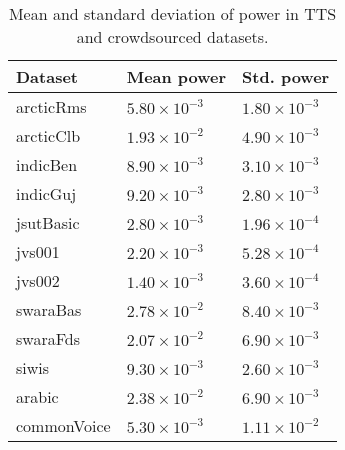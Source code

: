 \documentclass[12pt]{article}
\begin{document}
\begin{table}[]
\begin{center}
\caption{Mean and standard deviation of power in TTS and crowdsourced datasets.}
\label{tab_powerDistribution}
\vspace{3mm}
\begin{tabular}{|l|l|l|}
\hline
Dataset & Mean power & Std. power \\
\hline
arcticRms   & $5.80\times10^{-3}$ & $1.80\times10^{-3}$ \\
arcticClb   & $1.93\times10^{-2}$ & $4.90\times10^{-3}$ \\
indicBen    & $8.90\times10^{-3}$ & $3.10\times10^{-3}$ \\
indicGuj    & $9.20\times10^{-3}$ & $2.80\times10^{-3}$ \\
jsutBasic   & $2.80\times10^{-3}$ & $1.96\times10^{-4}$ \\
jvs001      & $2.20\times10^{-3}$ & $5.28\times10^{-4}$ \\
jvs002      & $1.40\times10^{-3}$ & $3.60\times10^{-4}$ \\
swaraBas    & $2.78\times10^{-2}$ & $8.40\times10^{-3}$ \\
swaraFds    & $2.07\times10^{-2}$ & $6.90\times10^{-3}$ \\
siwis       & $9.30\times10^{-3}$ & $2.60\times10^{-3}$ \\
arabic      & $2.38\times10^{-2}$ & $6.90\times10^{-3}$ \\
commonVoice & $5.30\times10^{-3}$ & $1.11\times10^{-2}$ \\
\hline
\end{tabular}
\end{center}
\end{table}
\end{document}
